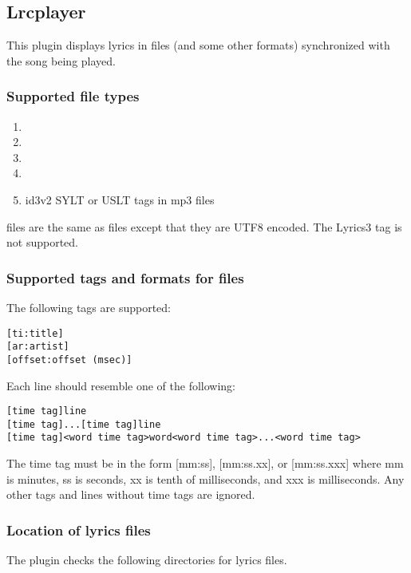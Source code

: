 \subsection{Lrcplayer}
This plugin displays lyrics in  files (and some other formats)
synchronized with the song being played.

\subsubsection{Supported file types}
\begin{enumerate}
\item {}
\item {}
\item {}
\item {}
\item id3v2 SYLT or USLT tags in mp3 files
\end{enumerate}

 files are the same as  files except that they are UTF8
encoded. The Lyrics3 tag is not supported.

\subsubsection{Supported tags and formats for  files}
The following tags are supported:
\begin{verbatim}
[ti:title]
[ar:artist]
[offset:offset (msec)]
\end{verbatim}

Each line should resemble one of the following:
\begin{verbatim}
[time tag]line
[time tag]...[time tag]line
[time tag]<word time tag>word<word time tag>...<word time tag>
\end{verbatim}

The time tag must be in the form [mm:ss], [mm:ss.xx], or [mm:ss.xxx] where mm is
minutes, ss is seconds, xx is tenth of milliseconds, and xxx is milliseconds.
Any other tags and lines without time tags are ignored.

\subsubsection{Location of lyrics files}
The plugin checks the following directories for lyrics files.

